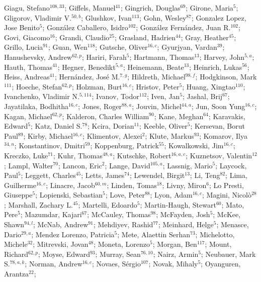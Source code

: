 Giagu, Stefano$^{108,33}$;
Giffels, Manuel$^{41}$;
Gingrich, Douglas$^{69}$;
Girone, Maria$^{5}$;
Gligorov, Vladimir V.$^{50,b}$;
Glushkov, Ivan$^{113}$;
Gohn, Wesley$^{87}$;
Gonzalez Lopez, Jose Benito$^{5}$;
González Caballero, Isidro$^{102}$;
González Fernández, Juan R.$^{102}$;
Govi, Giacomo$^{16}$;
Grandi, Claudio$^{25}$;
Grasland, Hadrien$^{44}$;
Gray, Heather$^{45}$;
Grillo, Lucia$^{91}$;
Guan, Wen$^{118}$;
Gutsche, Oliver$^{16,c}$;
Gyurjyan, Vardan$^{39}$;
Hanushevsky, Andrew$^{62,p}$;
Hariri, Farah$^{5}$;
Hartmann, Thomas$^{13}$;
Harvey, John$^{5,a}$;
Hauth, Thomas$^{41}$;
Hegner, Benedikt$^{5,a}$;
Heinemann, Beate$^{13}$;
Heinrich, Lukas$^{56}$;
Heiss, Andreas$^{41}$;
Hernández, José M.$^{7,g}$;
Hildreth, Michael$^{98,f}$;
Hodgkinson, Mark$^{111}$;
Hoeche, Stefan$^{62,p}$;
Holzman, Burt$^{16,c}$;
Hristov, Peter$^{5}$;
Huang, Xingtao$^{110}$;
Ivanchenko, Vladimir N.$^{5,114}$;
Ivanov, Todor$^{112}$;
Iven, Jan$^{5}$;
Jashal, Brij$^{67}$;
Jayatilaka, Bodhitha$^{16,c}$;
Jones, Roger$^{88,a}$;
Jouvin, Michel$^{44,a}$;
Jun, Soon Yung$^{16,c}$;
Kagan, Michael$^{62,p}$;
Kalderon, Charles William$^{90}$;
Kane, Meghan$^{64}$;
Karavakis, Edward$^{5}$;
Katz, Daniel S.$^{78}$;
Kcira, Dorian$^{11}$;
Keeble, Oliver$^{5}$;
Kersevan, Borut Paul$^{89}$;
Kirby, Michael$^{16,c}$;
Klimentov, Alexei$^{2}$;
Klute, Markus$^{93}$;
Komarov, Ilya$^{34,n}$;
Konstantinov, Dmitri$^{59}$;
Koppenburg, Patrick$^{55}$;
Kowalkowski, Jim$^{16,c}$;
Kreczko, Luke$^{71}$;
Kuhr, Thomas$^{48,a}$;
Kutschke, Robert$^{16,a,c}$;
Kuznetsov, Valentin$^{12}$;
Lampl, Walter$^{70}$;
Lancon, Eric$^{2}$;
Lange, David$^{105,a}$;
Lassnig, Mario$^{5}$;
Laycock, Paul$^{5}$;
Leggett, Charles$^{45}$;
Letts, James$^{74}$;
Lewendel, Birgit$^{13}$;
Li, Teng$^{82}$;
Lima, Guilherme$^{16,c}$;
Linacre, Jacob$^{60,m}$;
Linden, Tomas$^{18}$;
Livny, Miron$^{6}$;
Lo Presti, Giuseppe$^{5}$;
Lopienski, Sebastian$^{5}$;
Love, Peter$^{88}$;
Lyon, Adam$^{16,c}$;
Magini, Nicolò$^{28}$;
Marshall, Zachary L.$^{45}$;
Martelli, Edoardo$^{5}$;
Martin-Haugh, Stewart$^{60}$;
Mato, Pere$^{5}$;
Mazumdar, Kajari$^{67}$;
McCauley, Thomas$^{98}$;
McFayden, Josh$^{5}$;
McKee, Shawn$^{94,l}$;
McNab, Andrew$^{91}$;
Mehdiyev, Rashid$^{77}$;
Meinhard, Helge$^{5}$;
Menasce, Dario$^{29,a}$;
Mendez Lorenzo, Patricia$^{5}$;
Mete, Alaettin Serhan$^{73}$;
Michelotto, Michele$^{32}$;
Mitrevski, Jovan$^{48}$;
Moneta, Lorenzo$^{5}$;
Morgan, Ben$^{117}$;
Mount, Richard$^{62,p}$;
Moyse, Edward$^{93}$;
Murray, Sean$^{76,10}$;
Nairz, Armin$^{5}$;
Neubauer, Mark S.$^{78,a,k}$;
Norman, Andrew$^{16,c}$;
Novaes, Sérgio$^{107}$;
Novak, Mihaly$^{5}$;
Oyanguren, Arantza$^{22}$;

